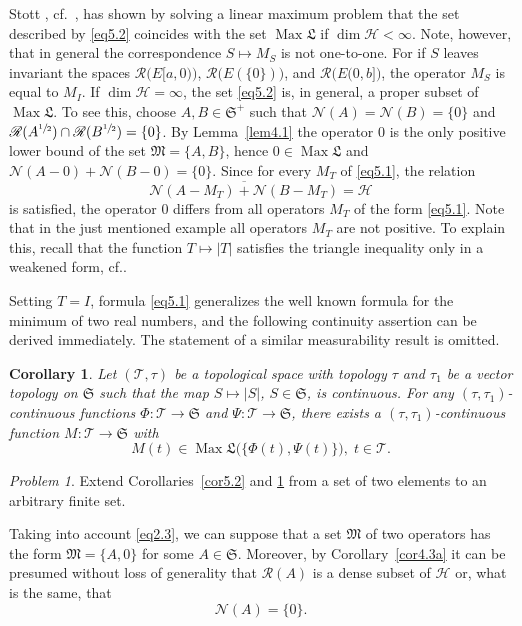 \documentclass[12pt, a4paper, reqno, twoside]{amsart}
\numberwithin{equation}{section}
\DeclareMathOperator{\Max}{Max}
\newcommand{\frakS}{\mathfrak S}
\newcommand{\frakL}{\mathfrak L}
\newcommand{\frakM}{\mathfrak M}
\newcommand{\cf}{\mbox{cf.}\xspace}
\newtheorem{corollary}[theorem]{Corollary}
\theoremstyle{definition}
\theoremstyle{remark}
\newtheorem*{problem*}{Problem}
\theoremstyle{mystyle}
\begin{document}
Stott \cite[Thm.~2.3]{Stott2017dis}, cf.\
\cite[Thm.~1]{GaubertStott2017}, has shown by solving a linear maximum
problem that the set described by \eqref{eq5.2} coincides with the set
$\Max\frakL$ if $\dim\mathscr H<\infty$. Note, however, that in
general the correspondence $S\mapsto M_{S}$ is not one-to-one. For if
$S$ leaves invariant the spaces $\mathscr R\bigl(E[a,0)\bigr)$,
$\mathscr R\bigl(E(\{0\})\bigr)$, and $\mathscr R\bigl(E(0,b]\bigr)$,
the operator $M_{S}$ is equal to $M_{I}$. If $\dim\mathscr H=\infty$,
the set \eqref{eq5.2} is, in general, a proper subset of
$\Max\frakL$. To see this, choose $A,B\in\frakS^{+}$ such that
$\mathscr N(A)=\mathscr N(B)=\{0\}$ and
$\mathscr R(A^{\sfrac{1}{2}})\cap\mathscr R(B^{\sfrac{1}{2}})=\{0\}$.
By Lemma~\ref{lem4.1} the operator $0$ is the only positive lower
bound of the set $\frakM=\{A,B\}$, hence $0\in\Max\frakL$
and $\mathscr N(A-0)+\mathscr N(B-0)=\{0\}$. Since for every $M_{T}$
of \eqref{eq5.1}, the relation
\[
  \overline{\mathscr N(A-M_{T})+\mathscr N(B-M_{T})}=\mathscr H
\]  
is satisfied, the operator $0$ differs from all
operators $M_{T}$ of the form \eqref{eq5.1}. Note that in the just
mentioned example all operators $M_{T}$ are not positive. To explain
this, recall that the function $T\mapsto|T|$ satisfies the triangle
inequality only in a weakened form,
\cf \cite[Thm. III.5.6]{Bhatia1997}.

Setting $T=I$, formula \eqref{eq5.1} generalizes the well known
formula  for the minimum of two real numbers, and the following
continuity assertion can be derived immediately. The statement of a
similar  measurability result is omitted.

\begin{corollary}
\label{cor5.3}
Let $(\mathscr T,\tau)$ be a topological space with topology $\tau$ and
$\tau_{1}$ be a vector topology on $\frakS$ such that the map
$S\mapsto |S|$, $S\in\frakS$, is continuous. For any
$(\tau,\tau_{1})$-continuous functions $\Phi:\mathscr T\to\frakS$ and
$\Psi:\mathscr T\to\frakS$, there exists a $(\tau,\tau_{1})$-continuous
function $M:\mathscr T\to\frakS$ with
\[
 M(t)\in\Max\frakL\bigl(\{\Phi(t),\Psi(t)\}\bigr),\;t\in\mathscr T. 
\]
\end{corollary}

\begin{problem*}
Extend Corollaries~\ref{cor5.2} and \ref{cor5.3} from a set of two
elements to an arbitrary finite set.
\end{problem*}

Taking into account \eqref{eq2.3}, we can suppose that a set $\frakM$
of two operators has the form $\frakM=\{A,0\}$ for some $A\in\frakS$.
Moreover, by Corollary~\ref{cor4.3a} it can be presumed without loss of
generality that $\mathscr R(A)$ is a dense subset of $\mathscr H$ or,
what is the same, that
\begin{equation}
  \label{eq5.3}
  \mathscr N(A)=\{0\}.
\end{equation}
\end{document}
